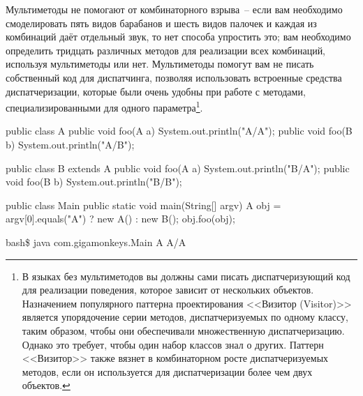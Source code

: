 Мультиметоды не помогают от комбинаторного взрыва~-- если вам необходимо смоделировать
пять видов барабанов и шесть видов палочек и каждая из комбинаций даёт отдельный звук, то
нет способа упростить это; вам необходимо определить тридцать различных методов для
реализации всех комбинаций, используя мультиметоды или нет.  Мультиметоды помогут вам не
писать собственный код для диспатчинга, позволяя использовать встроенные средства
диспатчеризации, которые были очень удобны при работе с методами, специализированными для
одного параметра\footnote{В языках без мультиметодов вы должны сами писать
  диспатчеризующий код для реализации поведения, которое зависит от нескольких объектов.
  Назначением популярного паттерна проектирования <<Визитор (Visitor)>> является
  упорядочение серии методов, диспатчеризуемых по одному классу, таким образом, чтобы они
  обеспечивали множественную диспатчеризацию.  Однако это требует, чтобы один набор
  классов знал о других.  Паттерн <<Визитор>> также вязнет в комбинаторном росте
  дис\-пат\-че\-ри\-зуе\-мых методов, если он используется для диспатчеризации более чем двух
  объектов.}.

\begin{lrbox}{\chonesixone}
  \begin{minipage}{\linewidth}
\begin{myverb}
public class A {
  public void foo(A a) { System.out.println("A/A"); }
  public void foo(B b) { System.out.println("A/B"); }
}

public class B extends A {
  public void foo(A a) { System.out.println("B/A"); }
  public void foo(B b) { System.out.println("B/B"); }
}
\end{myverb}
  \end{minipage}
\end{lrbox}

\begin{lrbox}{\chonesixtwo}
  \begin{minipage}{\linewidth}
\begin{myverb}
public class Main {
  public static void main(String[] argv) {
    A obj = argv[0].equals("A") ? new A() : new B();
    obj.foo(obj);
  }
}
\end{myverb}
  \end{minipage}
\end{lrbox}

\begin{lrbox}{\chonesixthree}
  \begin{minipage}{\linewidth}
\begin{myverb}
bash\$ java com.gigamonkeys.Main A
A/A
\end{myverb}
  \end{minipage}
\end{lrbox}

